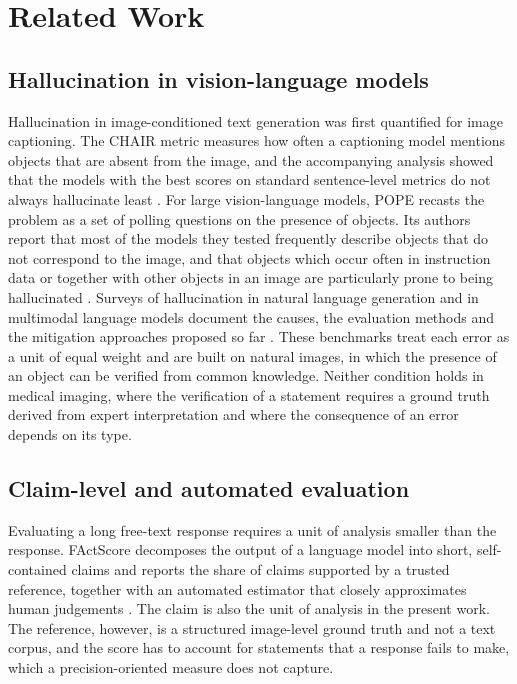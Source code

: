 \section{Related Work}
\label{sec:related}


\subsection{Hallucination in vision-language models}
\label{subsec:rw_vlm}

Hallucination in image-conditioned text generation was first quantified for image captioning. The CHAIR metric measures how often a captioning model mentions objects that are absent from the image, and the accompanying analysis showed that the models with the best scores on standard sentence-level metrics do not always hallucinate least \citep{rohrbach2018chair}. For large vision-language models, POPE recasts the problem as a set of polling questions on the presence of objects. Its authors report that most of the models they tested frequently describe objects that do not correspond to the image, and that objects which occur often in instruction data or together with other objects in an image are particularly prone to being hallucinated \citep{li2023pope}. Surveys of hallucination in natural language generation and in multimodal language models document the causes, the evaluation methods and the mitigation approaches proposed so far \citep{ji2023survey,bai2024hallucination}. These benchmarks treat each error as a unit of equal weight and are built on natural images, in which the presence of an object can be verified from common knowledge. Neither condition holds in medical imaging, where the verification of a statement requires a ground truth derived from expert interpretation and where the consequence of an error depends on its type.

\subsection{Claim-level and automated evaluation}
\label{subsec:rw_claims}

Evaluating a long free-text response requires a unit of analysis smaller than the response. FActScore decomposes the output of a language model into short, self-contained claims and reports the share of claims supported by a trusted reference, together with an automated estimator that closely approximates human judgements \citep{min2023factscore}. The claim is also the unit of analysis in the present work. The reference, however, is a structured image-level ground truth and not a text corpus, and the score has to account for statements that a response fails to make, which a precision-oriented measure does not capture.

